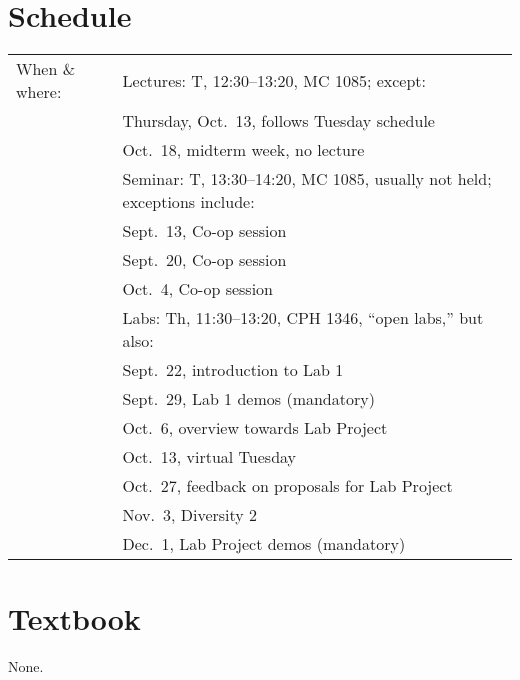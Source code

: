 \documentclass[11pt,onecolumn]{article}
\begin{document}
\section*{Schedule}
\begin{tabular}{ @{\hspace{0.25in}}l l }
    When \& where: & Lectures: T, 12:30--13:20, MC 1085; except: \\
      & \hspace*{0.5in} Thursday, Oct.~13, follows Tuesday schedule\\
      & \hspace*{0.5in} Oct.~18, midterm week, no lecture\\[0.5em]
      & Seminar: T, 13:30--14:20, MC 1085, usually not held; exceptions include:\\
      & \hspace*{0.5in} Sept.~13, Co-op session\\
      & \hspace*{0.5in} Sept.~20, Co-op session\\
      & \hspace*{0.5in} Oct.~4, Co-op session \\[0.5em]
      & Labs: Th, 11:30--13:20, CPH 1346, ``open labs,'' but also: \\
      & \hspace*{0.5in} Sept.~22, introduction to Lab 1\\
      & \hspace*{0.5in} Sept.~29, Lab 1 demos (mandatory)\\
      & \hspace*{0.5in} Oct.~6, overview towards Lab Project\\
      & \hspace*{0.5in} Oct.~13, virtual Tuesday\\
      & \hspace*{0.5in} Oct.~27, feedback on proposals for Lab Project\\
      & \hspace*{0.5in} Nov.~3, Diversity 2\\
      & \hspace*{0.5in} Dec.~1, Lab Project demos (mandatory)\\
\end{tabular}

\section*{Textbook}
None.
\end{document}
